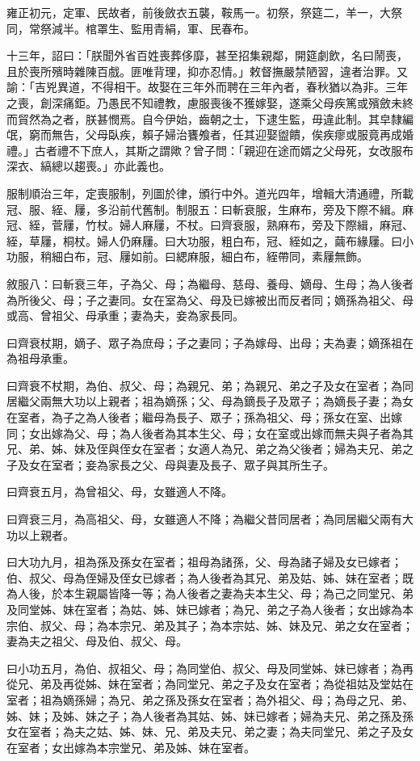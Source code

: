 \begin{pinyinscope}
雍正初元，定軍、民故者，前後斂衣五襲，鞍馬一。初祭，祭筵二，羊一，大祭同，常祭減半。棺罩生、監用青絹，軍、民春布。

十三年，詔曰：「朕聞外省百姓喪葬侈靡，甚至招集親鄰，開筵劇飲，名曰鬧喪，且於喪所殯時雜陳百戲。匪唯背理，抑亦忍情。」敕督撫嚴禁陋習，違者治罪。又諭：「吉兇異道，不得相干。故娶在三年外而聘在三年內者，春秋猶以為非。三年之喪，創深痛鉅。乃愚民不知禮教，慮服喪後不獲嫁娶，遂乘父母疾篤或殯斂未終而貿然為之者，朕甚憫焉。自今伊始，齒朝之士，下逮生監，毋違此制。其皁隸編氓，窮而無告，父母臥疾，賴子婦治饔飧者，任其迎娶盥饋，俟疾瘳或服竟再成婚禮。」古者禮不下庶人，其斯之謂歟？曾子問：「親迎在途而婿之父母死，女改服布深衣、縞總以趨喪。」亦此義也。

服制順治三年，定喪服制，列圖於律，頒行中外。道光四年，增輯大清通禮，所載冠、服、絰、屨，多沿前代舊制。制服五：曰斬衰服，生麻布，旁及下際不緝。麻冠、絰，菅屨，竹杖。婦人麻屨，不杖。曰齊衰服，熟麻布，旁及下際緝，麻冠、絰，草屨，桐杖。婦人仍麻屨。曰大功服，粗白布，冠、絰如之，繭布緣屨。曰小功服，稍細白布，冠、屨如前。曰緦麻服，細白布，絰帶同，素屨無飾。

敘服八：曰斬衰三年，子為父、母；為繼母、慈母、養母、嫡母、生母；為人後者為所後父、母；子之妻同。女在室為父、母及已嫁被出而反者同；嫡孫為祖父、母或高、曾祖父、母承重；妻為夫，妾為家長同。

曰齊衰杖期，嫡子、眾子為庶母；子之妻同；子為嫁母、出母；夫為妻；嫡孫祖在為祖母承重。

曰齊衰不杖期，為伯、叔父、母；為親兄、弟；為親兄、弟之子及女在室者；為同居繼父兩無大功以上親者；祖為嫡孫；父、母為鏑長子及眾子；為嫡長子妻；為女在室者，為子之為人後者；繼母為長子、眾子；孫為祖父、母；孫女在室、出嫁同；女出嫁為父、母；為人後者為其本生父、母；女在室或出嫁而無夫與子者為其兄、弟、姊、妹及侄與侄女在室者；女適人為兄、弟之為父後者；婦為夫兄、弟之子及女在室者；妾為家長之父、母與妻及長子、眾子與其所生子。

曰齊衰五月，為曾祖父、母，女雖適人不降。

曰齊衰三月，為高祖父、母，女雖適人不降；為繼父昔同居者；為同居繼父兩有大功以上親者。

曰大功九月，祖為孫及孫女在室者；祖母為諸孫，父、母為諸子婦及女已嫁者；伯、叔父、母為侄婦及侄女已嫁者；為人後者為其兄、弟及姑、姊、妹在室者；既為人後，於本生親屬皆降一等；為人後者之妻為夫本生父、母；為己之同堂兄、弟及同堂姊、妹在室者；為姑、姊、妹已嫁者；為兄、弟之子為人後者；女出嫁為本宗伯、叔父、母；為本宗兄、弟及其子；為本宗姑、姊、妹及兄、弟之女在室者；妻為夫之祖父、母及伯、叔父、母。

曰小功五月，為伯、叔祖父、母；為同堂伯、叔父、母及同堂姊、妹已嫁者；為再從兄、弟及再從姊、妹在室者；為同堂兄、弟之子及女在室者；為從祖姑及堂姑在室者；祖為嫡孫婦；為兄、弟之孫及孫女在室者；為外祖父、母；為母之兄、弟、姊、妹；及姊、妹之子；為人後者為其姑、姊、妹已嫁者；婦為夫兄、弟之孫及孫女在室者；為夫之姑、姊、妹、兄、弟及夫兄、弟之妻；為夫同堂兄、弟之子及女在室者；女出嫁為本宗堂兄、弟及姊、妹在室者。


\end{pinyinscope}
